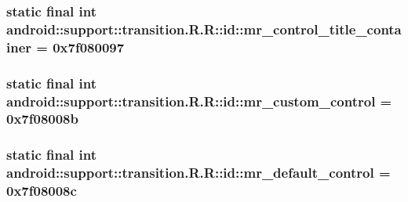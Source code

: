 \hypertarget{classandroid_1_1support_1_1transition_1_1_r_1_1id_b432c437e4022e712c08cf3814489de1}{
\subsubsection[{mr\_\-control\_\-title\_\-container}]{\setlength{\rightskip}{0pt plus 5cm}static final int android::support::transition.R.R::id::mr\_\-control\_\-title\_\-container = 0x7f080097}}
\label{classandroid_1_1support_1_1transition_1_1_r_1_1id_b432c437e4022e712c08cf3814489de1}


\hypertarget{classandroid_1_1support_1_1transition_1_1_r_1_1id_8bfdf3ead863003f388162925f28b1dd}{
\subsubsection[{mr\_\-custom\_\-control}]{\setlength{\rightskip}{0pt plus 5cm}static final int android::support::transition.R.R::id::mr\_\-custom\_\-control = 0x7f08008b}}
\label{classandroid_1_1support_1_1transition_1_1_r_1_1id_8bfdf3ead863003f388162925f28b1dd}


\hypertarget{classandroid_1_1support_1_1transition_1_1_r_1_1id_785180b83ebe6059f60245cd1339c6c7}{
\subsubsection[{mr\_\-default\_\-control}]{\setlength{\rightskip}{0pt plus 5cm}static final int android::support::transition.R.R::id::mr\_\-default\_\-control = 0x7f08008c}}
\label{classandroid_1_1support_1_1transition_1_1_r_1_1id_785180b83ebe6059f60245cd1339c6c7}


